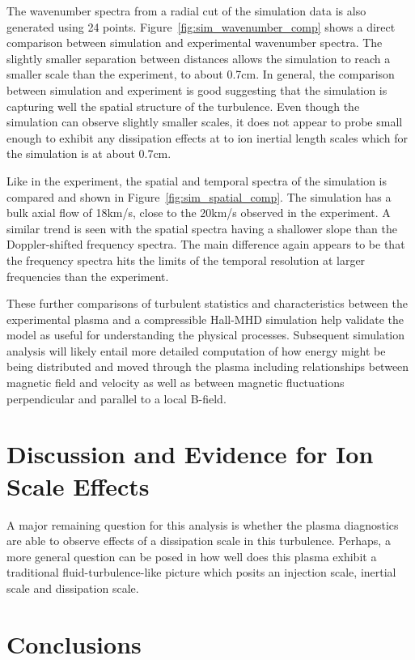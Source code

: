 \documentclass[aip,prl,amsmath,amssymb,reprint,superscriptaddress]{revtex4-1} %
\begin{document}
The wavenumber spectra from a radial cut of the simulation data is also generated using 24 points. Figure~\ref{fig:sim_wavenumber_comp} shows a direct comparison between simulation and experimental wavenumber spectra. The slightly smaller separation between distances allows the simulation to reach a smaller scale than the experiment, to about 0.7cm. In general, the comparison between simulation and experiment is good suggesting that the simulation is capturing well the spatial structure of the turbulence. Even though the simulation can observe slightly smaller scales, it does not appear to probe small enough to exhibit any dissipation effects at to ion inertial length scales which for the simulation is at about 0.7cm.

Like in the experiment, the spatial and temporal spectra of the simulation is compared and shown in Figure~\ref{fig:sim_spatial_comp}. The simulation has a bulk axial flow of 18km/s, close to the 20km/s observed in the experiment. A similar trend is seen with the spatial spectra having a shallower slope than the Doppler-shifted frequency spectra. The main difference again appears to be that the frequency spectra hits the limits of the temporal resolution at larger frequencies than the experiment.

These further comparisons of turbulent statistics and characteristics between the experimental plasma and a compressible Hall-MHD simulation help validate the model as useful for understanding the physical processes. Subsequent simulation analysis will likely entail more detailed computation of how energy might be being distributed and moved through the plasma including relationships between magnetic field and velocity as well as between magnetic fluctuations perpendicular and parallel to a local B-field.

\section{Discussion and Evidence for Ion Scale Effects}

A major remaining question for this analysis is whether the plasma diagnostics are able to observe effects of a dissipation scale in this turbulence. Perhaps, a more general question can be posed in how well does this plasma exhibit a traditional fluid-turbulence-like picture which posits an injection scale, inertial scale and dissipation scale.

\section{Conclusions}
\end{document}
